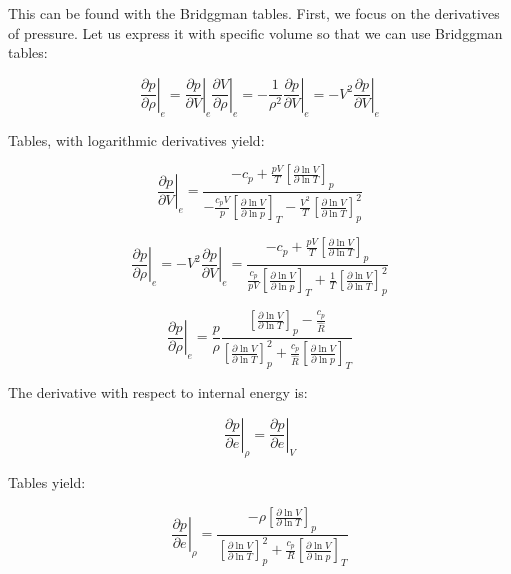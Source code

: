 \documentclass[10pt]{article}
\begin{document}
\begin{flushleft}
This can be found with the Bridggman tables. First, we focus on the derivatives of pressure. Let us express it with specific volume so that we can use Bridggman tables:

\begin{equation}
    \left.\frac{\partial p}{\partial \rho}\right|_e  = \left.\frac{\partial p}{\partial V}\right|_e \left.\frac{\partial V}{\partial \rho}\right|_e =  - \frac{1}{\rho^2} \left.\frac{\partial p}{\partial V}\right|_e = -V^2 \left.\frac{\partial p}{\partial V}\right|_e 
\end{equation}

Tables, with logarithmic derivatives yield:

\begin{equation}
    \left.\frac{\partial p}{\partial V}\right|_e = \frac{-c_p + \frac{pV}{T} \left[\frac{\partial \ln V}{\partial \ln T} \right]_p}{-\frac{c_p V}{p} \left[ \frac{\partial \ln V}{\partial \ln p} \right]_T - \frac{V^2}{T} \left[ \frac{\partial \ln V}{\partial \ln T} \right]_p^2}
\end{equation}

\begin{equation}
    \left.\frac{\partial p}{\partial \rho}\right|_e = -V^2 \left.\frac{\partial p}{\partial V}\right|_e = \frac{-c_p + \frac{pV}{T} \left[ \frac{\partial \ln V}{\partial \ln T} \right]_p}{\frac{c_p}{pV} \left[\frac{\partial \ln V}{\partial \ln p} \right]_T + \frac{1}{T} \left[\frac{\partial \ln V}{\partial \ln T} \right]_p^2}
\end{equation}


\begin{equation}
    \boxed{\left. \frac{\partial p}{\partial \rho} \right|_e = \frac{p}{\rho} \frac{\left[ \frac{\partial \ln V}{\partial \ln T} \right]_p - \frac{c_p}{\hat{R}}}{\left[ \frac{\partial \ln V}{\partial \ln T} \right]_p^2 + \frac{c_p}{ \hat{R} }\left[\frac{\partial \ln V}{\partial \ln p}\right]_T}}
\end{equation}


The derivative with respect to internal energy is:

\begin{equation}
    \left.\frac{\partial p}{\partial e}\right|_\rho = \left.\frac{\partial p}{\partial e}\right|_V
\end{equation}

Tables yield:


\begin{equation}
    \boxed{\left.\frac{\partial p}{\partial e}\right|_\rho = \frac{-\rho \left[ \frac{\partial \ln V}{\partial \ln T} \right]_p}{\left[ \frac{\partial \ln V}{\partial \ln T}\right]_p^2 + \frac{c_p}{R} \left[ \frac{\partial \ln V}{\partial \ln p} \right]_T}}
\end{equation}


\end{flushleft}
\end{document}
